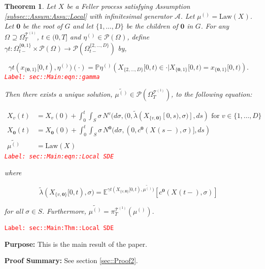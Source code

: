 \documentclass[12pt]{article}
\newcommand{\mb}{\mathbb}
\newcommand{\mc}{\mathcal}
\newcommand{\ra}{\rightarrow}
\newcommand{\te}{\text}
\newcommand{\tr}{\textcolor{red}}
\newcommand{\labe}[1]{\tr{\texttt{Label: #1}}}
\newcommand{\purpose}{\textbf{Purpose: }}
\newcommand{\pfsum}{\textbf{Proof Summary: }}
\newcommand{\pr}{\mb{P}}							%
\newcommand{\exmu}[2]{\mb{E}^{#1}\left[#2\right]}	%
\newcommand{\pmsr}{\mc{P}}							%
\renewcommand{\root}{\mathbf{0}}				%
\renewcommand{\v}{v}							%
\renewcommand{\S}{S}							%
\newcommand{\s}{\sigma}							%
\newcommand{\T}{T}								%
\newcommand{\x}{x}								%
\renewcommand{\t}{t}							%
\newcommand{\sset}{\Omega}						%
\newcommand{\proj}{\pi}							%
\renewcommand{\tt}{s}							%
\newcommand{\X}{X}								%
\newcommand{\IG}{\mc{A}}						%
\newcommand{\IGr}{c}							%
\newcommand{\vind}[1]{^{#1}}					%
\newcommand{\vsi}[1]{^{#1}}						%
\newcommand{\cind}[1]{_{#1}}					%
\newcommand{\tp}[1]{(#1)}						%
\newcommand{\tip}[1]{#1}						%
\newcommand{\ts}[1]{_{#1}}						%
\newcommand{\degr}{D}							%
\newcommand{\tree}{\mc{T}}						%
\newcommand{\sln}[1]{^{(#1)}}						%
\newcommand{\poiss}{N}							%
\newcommand{\alt}[1]{\widetilde{#1}}			%
\newcommand{\m}{\mu}							%
\newcommand{\mmm}{\eta}							%
\newcommand{\cm}{\gamma}						%
\newcommand{\law}{\te{Law}}						%
\newcommand{\crate}{\alt{\lambda}}				%
\newtheorem{thms}{Theorem}[section]
\begin{document}
\begin{thms}
Let \(\X\cind{}\tip{}\) be a Feller process satisfying Assumption \ref{subsec::Assum:Assu::Local} with infinitesimal generator \(\IG\). Let \(\m\sln{}\ts{} = \law(\X\cind{}\tip{})\). Let \(\root\) be the root of \(G\) and let \(\{1,\dots,\degr\}\) be the children of \(\root\) in \(G\). For any \(\sset\vsi{}\ts{} \supseteq\sset\vsi{\tree\sln{1}}\ts{\T}\), \(\t\in (0,\T]\) and \(\mmm\sln{}\ts{} \in \pmsr(\sset\vsi{}\ts{})\), define \(\cm{\t}:\sset\vsi{\{\root,1\}}\ts{\t-}\times \pmsr(\sset\vsi{}\ts{}) \ra \pmsr(\sset\vsi{\{2,\dots,\degr\}}\ts{\t-})\) by,

\begin{equation}
\cm{\t}(\x\cind{\{\root,1\}}\tip{[0,\t)},\mmm\sln{}\ts{})(\cdot) = \pr{\mmm\sln{}\ts{}}\left(\X\cind{\{2,\dots,\degr\}}\tip{[0,\t)} \in \cdot|\X\cind{\{\root,1\}}\tip{[0,\t)} = \x\cind{\{\root,1\}}\tip{[0,\t)}\right).
\label{sec::Main:eqn::gamma}
\end{equation}
\labe{sec::Main:eqn::gamma}

Then there exists a unique solution, \(\alt{\m\sln{}\ts{}} \in \pmsr(\sset\vsi{\tree\sln{1}}\ts{\T})\), to the following equation:

\begin{align}
\X\cind{\v}\tp{\t} &= \X\cind{\v}\tp{0} + \int_0^\t\int_\S \s\,\poiss\vind{\v}(d\s,(0,\crate{}(\X\cind{\{\v,\root\}}\tip{[0,\tt)},\s)],d\tt) \te{ for } \v \in \{1,\dots,\degr\}\nonumber\\
\X\cind{\root}\tp{\t} &= \X\cind{\root}\tp{0} + \int_0^\t\int_\S \s\,\poiss\vind{\root}(d\s,(0,\IGr\vind{\root}(\X\cind{}\tp{\tt-},\s)],d\tt)\nonumber\\
\alt{\m\sln{}\ts{}} &= \law(\X\cind{}\tip{})
\label{sec::Main:eqn::Local SDE}
\end{align}
\labe{sec::Main:eqn::Local SDE}

where

\[\crate{}(\X\cind{\{\v,\root\}}\tip{[0,\t)},\s) = \exmu{\cm{\t}(\X\cind{\{\v,\root\}}\tip{[0,\t)},\alt{\m\sln{}\ts{}})}{\IGr\vind{\root}(\X\cind{}\tp{\t-},\s)}\]

for all \(\s\in \S\). Furthermore, \(\alt{\m\sln{}\ts{}} = \proj\vsi{\tree\sln{1}}\ts{\T}(\m\sln{}\ts{})\).
\label{sec::Main:Thm::Local SDE}
\end{thms}
\labe{sec::Main:Thm::Local SDE}

\purpose This is the main result of the paper. 

\pfsum See section \ref{sec::Proof2}.
\end{document}
